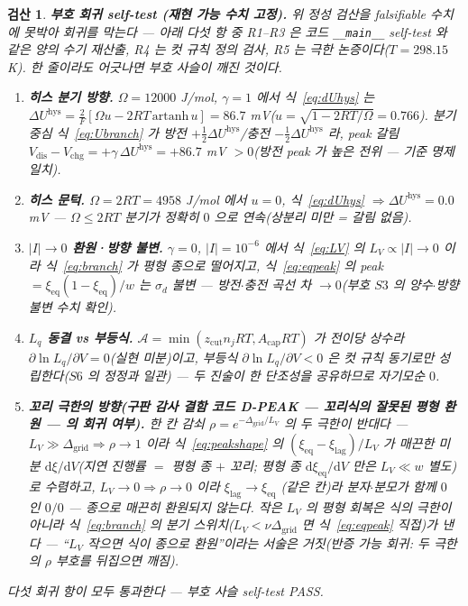 \documentclass[11pt,a4paper]{article}
\newtheorem*{verifybox}{검산}
\newcommand{\dd}{\mathrm{d}}
\newcommand{\eq}{\mathrm{eq}}
\newcommand{\dis}{\mathrm{dis}}
\newcommand{\chg}{\mathrm{chg}}
\newcommand{\hys}{\mathrm{hys}}
\newcommand{\code}[1]{\texttt{#1}}
\begin{document}
\begin{verifybox}
\textbf{부호 회귀 self-test (재현 가능 수치 고정).} 위 정성 검산을 falsifiable 수치에 못박아 회귀를 막는다 — 아래
다섯 항 중 R1--R3 은 코드 \code{\_\_main\_\_} self-test 와 같은 양의 수기 재산출, R4 는 컷 규칙 정의 검사,
R5 는 극한 논증이다($T=298.15$ K). 한 줄이라도 어긋나면
부호 사슬이 깨진 것이다.
\begin{enumerate}[label=\textbf{R\arabic*.},leftmargin=2.6em,itemsep=1pt]
\item \textbf{히스 분기 방향.} $\Omega=12000$ J/mol, $\gamma=1$ 에서 식~\eqref{eq:dUhys} 는
$\Delta U^\hys=\frac{2}{F}[\Omega u-2RT\,\mathrm{artanh}\,u]=86.7$ mV($u=\sqrt{1-2RT/\Omega}=0.766$). 분기 중심
식~\eqref{eq:Ubranch} 가 방전 $+\tfrac12\Delta U^\hys$/충전 $-\tfrac12\Delta U^\hys$ 라, peak 갈림
$V_\dis-V_\chg=+\gamma\,\Delta U^\hys=+86.7$ mV $>0$(방전 peak 가 높은 전위 — 기준 명제 일치).
\item \textbf{히스 문턱.} $\Omega=2RT=4958$ J/mol 에서 $u=0$, 식~\eqref{eq:dUhys} $\Rightarrow\Delta U^\hys=0.0$ mV —
$\Omega\le2RT$ 분기가 정확히 $0$ 으로 연속(상분리 미만 = 갈림 없음).
\item \textbf{$|I|\!\to\!0$ 환원·방향 불변.} $\gamma=0$, $|I|=10^{-6}$ 에서 식~\eqref{eq:LV} 의 $L_V\propto|I|\to0$ 이라
식~\eqref{eq:branch} 가 평형 종으로 떨어지고, 식~\eqref{eq:eqpeak} 의 peak $=\xi_\eq(1-\xi_\eq)/w$ 는 $\sigma_d$ 불변 —
방전$\cdot$충전 곡선 차 $\to0$(부호 $S3$ 의 양수$\cdot$방향 불변 수치 확인).
\item \textbf{$L_q$ 동결 vs 부등식.} $\mathcal A=\min(z_\mathrm{cut}n_jRT,A_\mathrm{cap}RT)$ 가 전이당 상수라
$\partial\ln L_q/\partial V=0$(실현 미분)이고, 부등식 $\partial\ln L_q/\partial V<0$ 은 컷 규칙 동기로만 성립한다($S6$ 의
정정과 일관) — 두 진술이 한 단조성을 공유하므로 자기모순 $0$.
\item \textbf{꼬리 극한의 방향(구판 감사 결함 코드 D-PEAK — 꼬리식의 잘못된 평형 환원 — 의 회귀 여부).} 한 칸 감쇠 $\rho=e^{-\Delta_\mathrm{grid}/L_V}$ 의 두 극한이 반대다 —
$L_V\!\gg\!\Delta_\mathrm{grid}\Rightarrow\rho\to1$ 이라 식~\eqref{eq:peakshape} 의 $(\xi_\eq-\xi_\mathrm{lag})/L_V$ 가
매끈한 미분 $\dd\xi/\dd V$(지연 진행률 $=$ 평형 종 $+$ 꼬리; 평형 종 $\dd\xi_\eq/\dd V$ 만은 $L_V\!\ll\!w$ 별도)로 수렴하고, $L_V\!\to\!0\Rightarrow\rho\to0$ 이라 $\xi_\mathrm{lag}\to\xi_\eq$
(같은 칸)라 분자$\cdot$분모가 함께 $0$ 인 $0/0$ — \emph{종으로 매끈히 환원되지 않는다}. 작은 $L_V$ 의 평형 회복은 식의
극한이 아니라 식~\eqref{eq:branch} 의 분기 스위치($L_V<\nu\Delta_\mathrm{grid}$ 면 식~\eqref{eq:eqpeak} 직접)가 낸다 —
``$L_V$ 작으면 식이 종으로 환원''이라는 서술은 거짓(반증 가능 회귀: 두 극한의 $\rho$ 부호를 뒤집으면 깨짐).
\end{enumerate}
다섯 회귀 항이 모두 통과한다 — 부호 사슬 self-test PASS.
\end{verifybox}
\end{document}
